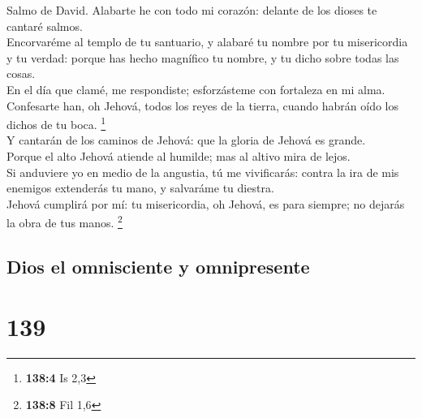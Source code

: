  Salmo de David. Alabarte he con todo mi corazón: delante
de los dioses te cantaré salmos.\\
 Encorvaréme al templo de tu santuario, y alabaré tu
nombre por tu misericordia y tu verdad: porque has hecho magnífico tu
nombre, y tu dicho sobre todas las cosas.\\
 En el día que clamé, me respondiste; esforzásteme con
fortaleza en mi alma.\\
 Confesarte han, oh Jehová, todos los reyes de la tierra,
cuando habrán oído los dichos de tu boca. \footnote{\textbf{138:4} Is
  2,3}\\
 Y cantarán de los caminos de Jehová: que la gloria de
Jehová es grande.\\
 Porque el alto Jehová atiende al humilde; mas al altivo
mira de lejos.\\
 Si anduviere yo en medio de la angustia, tú me
vivificarás: contra la ira de mis enemigos extenderás tu mano, y
salvaráme tu diestra.\\
 Jehová cumplirá por mí: tu misericordia, oh Jehová, es
para siempre; no dejarás la obra de tus manos. \footnote{\textbf{138:8}
  Fil 1,6}

\hypertarget{dios-el-omnisciente-y-omnipresente}{%
\subsection{Dios el omnisciente y
omnipresente}\label{dios-el-omnisciente-y-omnipresente}}

\hypertarget{section-138}{%
\section{139}\label{section-138}}

